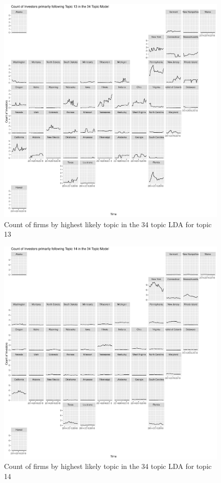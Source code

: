 		\begin{figure}
		\centering
		\includegraphics[width=1\linewidth]{Figures/ChapterV/USA_34_Topic13.pdf}
		\caption[Count of Firms for Topic 13 by Quarter]{Count of firms by highest likely topic in the 34 topic LDA for topic 13}
		\label{fig:StateLDA13}
	\end{figure}
	
		\begin{figure}
		\centering
		\includegraphics[width=1\linewidth]{Figures/ChapterV/USA_34_Topic14.pdf}
		\caption[Count of Firms for Topic 14 by Quarter]{Count of firms by highest likely topic in the 34 topic LDA for topic 14}
		\label{fig:StateLDA14}
	\end{figure}
	
